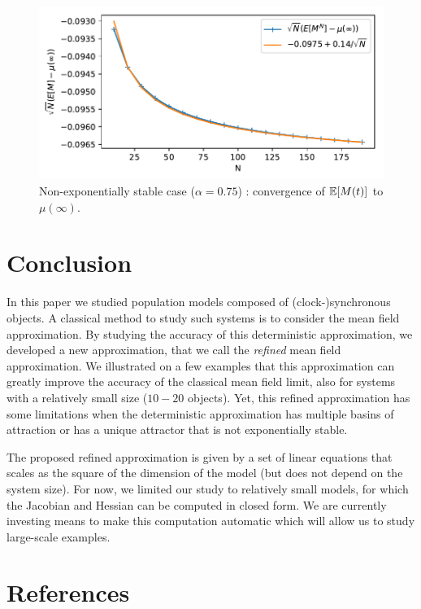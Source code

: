 \documentclass{elsarticle}
\begin{document}
\begin{figure}[ht]
  \centering
  \includegraphics[width=.8\linewidth]{unstable1D_steadyState}
  
  \caption{Non-exponentially stable case ($\alpha=0.75$) : convergence
    of $\esp{M(t)}$ to $\mu(\infty)$. }
  \label{fig:unstable_steadyState}
\end{figure}


\section{Conclusion}
\label{sec:conclusion}

In this paper we studied population models composed of
(clock-)synchronous objects. A classical method to study such systems
is to consider the mean field approximation. By studying the accuracy
of this deterministic approximation, we developed a new approximation,
that we call the \emph{refined} mean field approximation. We
illustrated on a few examples that this approximation can greatly
improve the accuracy of the classical mean field limit, also for
systems with a relatively small size ($10-20$ objects). Yet, this
refined approximation has some limitations when the deterministic
approximation has multiple basins of attraction or has a unique
attractor that is not exponentially stable.

The proposed refined approximation is given by a set of linear
equations that scales as the square of the dimension of the model (but
does not depend on the system size). For now, we limited our study to
relatively small models, for which the Jacobian and Hessian can be
computed in closed form. We are currently investing means to make this
computation automatic which will allow us to study large-scale
examples. 

\section*{References}

\end{document}
